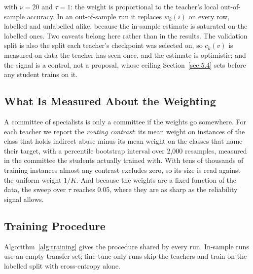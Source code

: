 with $\nu = 20$ and $\tau = 1$: the weight is proportional to the teacher's local out-of-sample
accuracy. In an out-of-sample run it replaces $w_k(i)$ on every row, labelled and unlabelled alike,
because the in-sample estimate is saturated on the labelled ones. Two caveats belong here rather
than in the results. The validation split is also the split each teacher's checkpoint was selected
on, so $c_k(v)$ is measured on data the teacher has seen once, and the estimate is optimistic; and
the signal is a control, not a proposal, whose ceiling Section~\ref{sec:5.4} sets before any student
trains on it.
\subsection{What Is Measured About the Weighting}
\label{sec:3.6}
A committee of specialists is only a committee if the weights go somewhere. For each teacher we
report the \emph{routing contrast}: its mean weight on instances of the class that holds indirect
abuse minus its mean weight on the classes that name their target, with a percentile bootstrap
interval over 2,000 resamples, measured in the committee the students actually trained with. With
tens of thousands of training instances almost any contrast excludes zero, so its size is read
against the uniform weight $1/K$. And because the weights are a fixed function of the data, the
sweep over $\tau$ reaches 0.05, where they are as sharp as the reliability signal allows.

\subsection{Training Procedure}
\label{sec:3.7}
Algorithm~\ref{alg:training} gives the procedure shared by every run. In-sample runs use an empty
transfer set; fine-tune-only runs skip the teachers and train on the labelled split with cross-entropy
alone.

